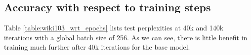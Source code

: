 \documentclass[11pt]{article}
\begin{document}
\begin{table}[hbt!]
    \centering
    {}
    \captionsetup{justification=centering}
    \caption{Latency and Valid Perplexity on WikiText-103 dataset with respect to training steps}
    \label{table:wiki103_wrt_epochs}
\end{table}

\subsection{Accuracy with respect to training steps}

Table \ref{table:wiki103_wrt_epochs} lists test perplexities at 40k and 140k iterations with a global batch size of 256. As we can see, there is little benefit in training much further after 40k iterations for the base model.
\end{document}
